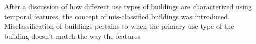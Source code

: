 After a discussion of how different use types of buildings are characterized using temporal features, the concept of mis-classified buildings was introduced. Misclassification of buildings pertains to when the primary use type of the building doesn't match the way the features 